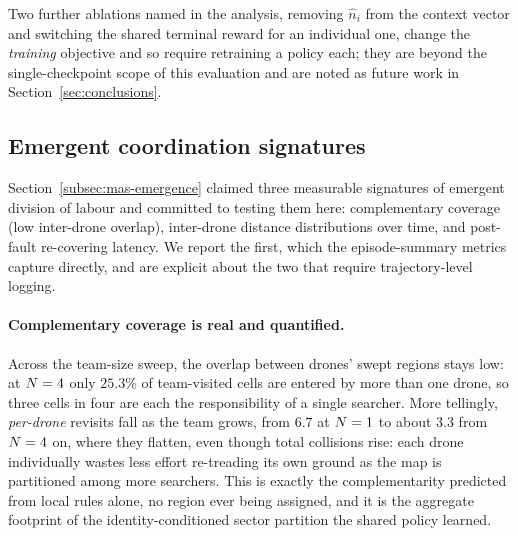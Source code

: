 Two further ablations named in the analysis, removing $\hat n_i$ from the context
vector and switching the shared terminal reward for an individual one, change the
\emph{training} objective and so require retraining a policy each; they are
beyond the single-checkpoint scope of this evaluation and are noted as future
work in Section~\ref{sec:conclusions}.

\subsection{Emergent coordination signatures}
\label{subsec:exp-qualitative}

Section~\ref{subsec:mas-emergence} claimed three measurable signatures of
emergent division of labour and committed to testing them here: complementary
coverage (low inter-drone overlap), inter-drone distance distributions over time,
and post-fault re-covering latency. We report the first, which the
episode-summary metrics capture directly, and are explicit about the two that
require trajectory-level logging.

\paragraph{Complementary coverage is real and quantified.}
Across the team-size sweep, the overlap between drones' swept regions stays low:
at $N = 4$ only $25.3\%$ of team-visited cells are entered by more than
one drone, so three cells in four are each the responsibility of a single
searcher. More tellingly, \emph{per-drone} revisits fall as the team grows, from
$6.7$ at $N = 1$ to about $3.3$ from $N = 4$ on, where they
flatten, even though total collisions rise: each drone individually wastes less
effort re-treading its own ground as the map is partitioned among more searchers.
This is exactly the complementarity predicted from local rules alone, no region
ever being assigned, and it is the aggregate footprint of the
identity-conditioned sector partition the shared policy learned.

